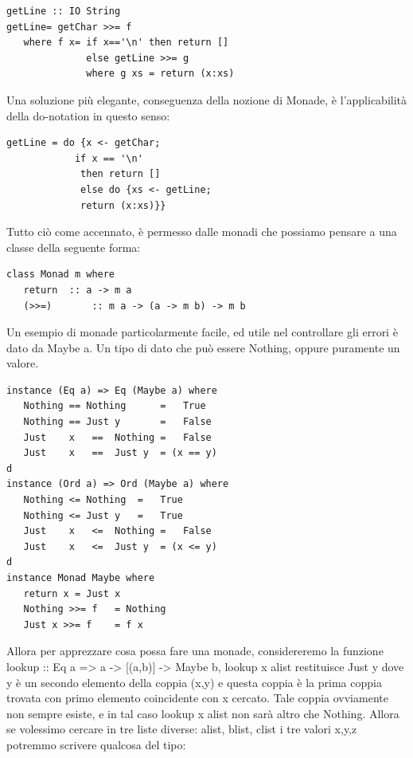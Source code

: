 \documentclass[a4papert]{article}
\begin{document}
\begin{lstlisting}[style=haskellstyle]
getLine :: IO String
getLine= getChar >>= f
   where f x= if x=='\n' then return []
              else getLine >>= g
              where g xs = return (x:xs)
\end{lstlisting}


Una soluzione più elegante, conseguenza della nozione di Monade, è l'applicabilità della do-notation in questo senso:

\begin{lstlisting}[style=haskellstyle]
getLine = do {x <- getChar;
            if x == '\n'
             then return []
             else do {xs <- getLine;
             return (x:xs)}}
\end{lstlisting}


Tutto ciò come accennato, è permesso dalle monadi che possiamo pensare a una classe della seguente forma:


\begin{lstlisting}[style=haskellstyle]
class Monad m where
   return  :: a -> m a
   (>>=)       :: m a -> (a -> m b) -> m b
\end{lstlisting}


Un esempio di monade particolarmente facile, ed utile nel controllare gli errori è dato da Maybe a. Un tipo di dato che può essere Nothing, oppure puramente un valore.


\begin{lstlisting}[style=haskellstyle]
instance (Eq a) => Eq (Maybe a) where
   Nothing == Nothing      =   True
   Nothing == Just y       =   False
   Just    x   ==  Nothing =   False
   Just    x   ==  Just y  = (x == y)
d
instance (Ord a) => Ord (Maybe a) where
   Nothing <= Nothing  =   True
   Nothing <= Just y   =   True
   Just    x   <=  Nothing =   False
   Just    x   <=  Just y  = (x <= y)
d
instance Monad Maybe where
   return x = Just x
   Nothing >>= f   = Nothing
   Just x >>= f    = f x
\end{lstlisting}


Allora per apprezzare cosa possa fare una monade, considereremo la funzione lookup :: Eq a => a -> [(a,b)] -> Maybe b, lookup x alist restituisce Just y dove y è un secondo elemento della coppia (x,y) e questa coppia è la prima coppia trovata con primo elemento coincidente con x cercato. Tale coppia ovviamente non sempre esiste, e in tal caso lookup x alist non sarà altro che Nothing. Allora se volessimo cercare in tre liste diverse: alist, blist, clist i tre valori x,y,z potremmo scrivere qualcosa del tipo:
\end{document}
